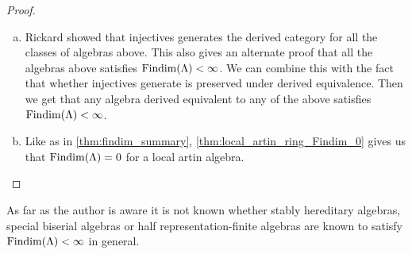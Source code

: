 \begin{theorem}
\begin{proof}
\begin{enumerate}[(a)]
			\item\label{item:Findim_derived_equiv} Rickard showed that injectives generates the derived category for all the classes of algebras above\cite[Theoreom~3.2, Corrolary~7.4-7.6]{Rick19}. This also gives an alternate proof that all the algebras above satisfies $\operatorname{Findim}(\Lambda) < \infty$. We can combine this with the fact that whether injectives generate is preserved under derived equivalence\cite[Theorem~3.4]{Rick19}. Then we get that any algebra derived equivalent to any of the above satisfies $\operatorname{Findim}(\Lambda) < \infty$.
			\item Like as in \cref{thm:findim_summary}, \cref{thm:local_artin_ring_Findim_0} gives us that $\operatorname{Findim}(\Lambda)=0$ for a local artin algebra.
		\end{enumerate}
	\end{proof}
\end{theorem}

As far as the author is aware it is not known whether stably hereditary algebras, special biserial algebras or half representation-finite algebras are known to satisfy $\operatorname{Findim}(\Lambda) < \infty$ in general.



